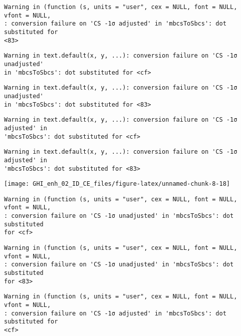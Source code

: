 \documentclass[
  10pt,
  a4paper,oneside]{article}
\begin{document}
\begin{verbatim}
Warning in (function (s, units = "user", cex = NULL, font = NULL, vfont = NULL,
: conversion failure on 'CS -1σ adjusted' in 'mbcsToSbcs': dot substituted for
<83>
\end{verbatim}

\begin{verbatim}
Warning in text.default(x, y, ...): conversion failure on 'CS -1σ unadjusted'
in 'mbcsToSbcs': dot substituted for <cf>
\end{verbatim}

\begin{verbatim}
Warning in text.default(x, y, ...): conversion failure on 'CS -1σ unadjusted'
in 'mbcsToSbcs': dot substituted for <83>
\end{verbatim}

\begin{verbatim}
Warning in text.default(x, y, ...): conversion failure on 'CS -1σ adjusted' in
'mbcsToSbcs': dot substituted for <cf>
\end{verbatim}

\begin{verbatim}
Warning in text.default(x, y, ...): conversion failure on 'CS -1σ adjusted' in
'mbcsToSbcs': dot substituted for <83>
\end{verbatim}

\begin{center}\texttt{[image: GHI\_enh\_02\_ID\_CE\_files/figure-latex/unnamed-chunk-8-18]} \end{center}

\begin{verbatim}
Warning in (function (s, units = "user", cex = NULL, font = NULL, vfont = NULL,
: conversion failure on 'CS -1σ unadjusted' in 'mbcsToSbcs': dot substituted
for <cf>
\end{verbatim}

\begin{verbatim}
Warning in (function (s, units = "user", cex = NULL, font = NULL, vfont = NULL,
: conversion failure on 'CS -1σ unadjusted' in 'mbcsToSbcs': dot substituted
for <83>
\end{verbatim}

\begin{verbatim}
Warning in (function (s, units = "user", cex = NULL, font = NULL, vfont = NULL,
: conversion failure on 'CS -1σ adjusted' in 'mbcsToSbcs': dot substituted for
<cf>
\end{verbatim}
\end{document}
